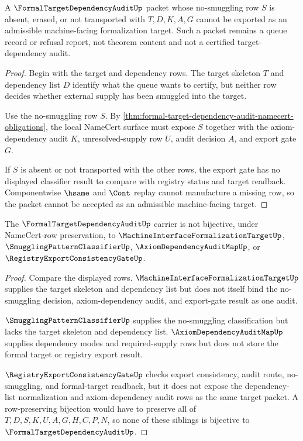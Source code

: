 \begin{theorem}
\label{thm:formal-target-dependency-audit-nonescape}
A $\FormalTargetDependencyAuditUp$ packet whose no-smuggling row $S$ is absent, erased, or not transported with $T,D,K,A,G$ cannot be exported as an admissible machine-facing formalization target. Such a packet remains a queue record or refusal report, not theorem content and not a certified target-dependency audit.
\end{theorem}
\begin{proof}
Begin with the target and dependency rows. The target skeleton $T$ and dependency list $D$ identify what the queue wants to certify, but neither row decides whether external supply has been smuggled into the target.

Use the no-smuggling row $S$. By \autoref{thm:formal-target-dependency-audit-namecert-obligations}, the local NameCert surface must expose $S$ together with the axiom-dependency audit $K$, unresolved-supply row $U$, audit decision $A$, and export gate $G$.

If $S$ is absent or not transported with the other rows, the export gate has no displayed classifier result to compare with registry status and target readback. Componentwise $\hsame$ and $\Cont$ replay cannot manufacture a missing row, so the packet cannot be accepted as an admissible machine-facing target.
\end{proof}

\begin{theorem}
\label{thm:formal-target-dependency-audit-sibling-independence}
The $\FormalTargetDependencyAuditUp$ carrier is not bijective, under NameCert-row preservation, to $\MachineInterfaceFormalizationTargetUp$, $\SmugglingPatternClassifierUp$, $\AxiomDependencyAuditMapUp$, or $\RegistryExportConsistencyGateUp$.
\end{theorem}
\begin{proof}
Compare the displayed rows. $\MachineInterfaceFormalizationTargetUp$ supplies the target skeleton and dependency list but does not itself bind the no-smuggling decision, axiom-dependency audit, and export-gate result as one audit.

$\SmugglingPatternClassifierUp$ supplies the no-smuggling classification but lacks the target skeleton and dependency list. $\AxiomDependencyAuditMapUp$ supplies dependency modes and required-supply rows but does not store the formal target or registry export result.

$\RegistryExportConsistencyGateUp$ checks export consistency, audit route, no-smuggling, and formal-target readback, but it does not expose the dependency-list normalization and axiom-dependency audit rows as the same target packet. A row-preserving bijection would have to preserve all of $T,D,S,K,U,A,G,H,C,P,N$, so none of these siblings is bijective to $\FormalTargetDependencyAuditUp$.
\end{proof}

